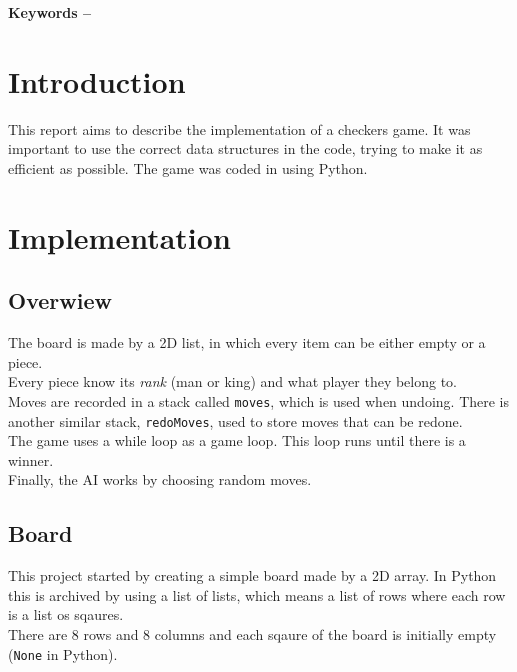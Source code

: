\documentclass[10pt, a4paper]{article}
\title{\mytitle}
\author{\myauthor\hspace{1em}\\\contact\\Edinburgh Napier University\hspace{0.5em}-\hspace{0.5em}\mymodule}
\date{}
\begin{document}
    \maketitle
    \begin{abstract}
        The goal of this coursework is to implement the classic board game of checkers in an arbitrary computer language demonstrating a correct use of data structures. The language chosen here is Python and the game can be played from the console.
    \end{abstract}
    
    \textbf{Keywords -- }{\mykeywords}
    
    \section{Introduction}
    This report aims to describe the implementation of a checkers game. It was important to use the correct data structures in the code, trying to make it as efficient as possible. The game was coded in using Python.
       
    \section{Implementation}
    
    \subsection{Overwiew}
    The board is made by a 2D list, in which every item can be either empty or a piece. \\
    Every piece know its \textit{rank} (man or king) and what player they belong to. \\
    Moves are recorded in a stack called \texttt{moves}, which is used when undoing. There is another similar stack, \texttt{redoMoves}, used to store moves that can be redone. \\
    The game uses a while loop as a game loop. This loop runs until there is a winner. \\
    Finally, the AI works by choosing random moves.
    
    \subsection{Board}
    This project started by creating a simple board made by a 2D array. In Python this is archived by using a list of lists, which means a list of rows where each row is a list os sqaures. \\
    There are 8 rows and 8 columns and each sqaure of the board is initially empty (\texttt{None} in Python).
    
\end{document}
